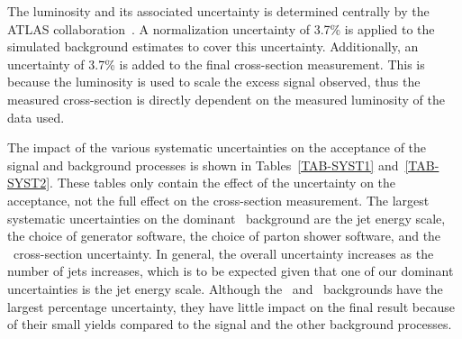 {}

The luminosity and its associated uncertainty is determined centrally by the ATLAS collaboration~\cite{ATLAS-LUMI}. A normalization uncertainty of 3.7\% is applied to the simulated background estimates to cover this uncertainty. Additionally, an uncertainty of 3.7\% is added to the final cross-section measurement. This is because the luminosity is used to scale the excess signal observed, thus the measured cross-section is directly dependent on the measured luminosity of the data used.  \\

{}

The impact of the various systematic uncertainties on the acceptance of the signal and background processes is shown in Tables~\ref{TAB-SYST1} and~\ref{TAB-SYST2}. These tables only contain the effect of the uncertainty on the acceptance, not the full effect on the cross-section measurement. The largest systematic uncertainties on the dominant \ttbar\ background are the jet energy scale, the choice of generator software, the choice of parton shower software, and the \ttbar\ cross-section uncertainty. In general, the overall uncertainty increases as the number of jets increases, which is to be expected given that one of our dominant uncertainties is the jet energy scale. Although the \Ztt\ and \multijet\ backgrounds have the largest percentage uncertainty, they have little impact on the final result because of their small yields compared to the signal and the other background processes.

